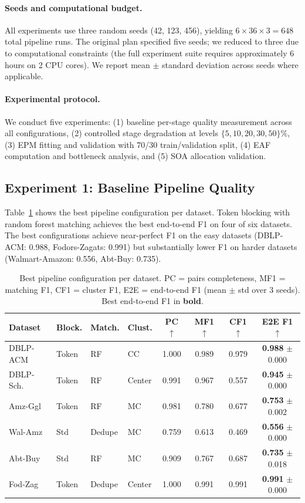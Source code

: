 \documentclass{article}
\begin{document}
\paragraph{Seeds and computational budget.}
All experiments use three random seeds (42, 123, 456), yielding $6 \times 36 \times 3 = 648$ total pipeline runs.
The original plan specified five seeds; we reduced to three due to computational constraints (the full experiment suite requires approximately 6 hours on 2 CPU cores). We report mean $\pm$ standard deviation across seeds where applicable.

\paragraph{Experimental protocol.}
We conduct five experiments: (1) baseline per-stage quality measurement across all configurations, (2) controlled stage degradation at levels $\{5, 10, 20, 30, 50\}\%$, (3) EPM fitting and validation with 70/30 train/validation split, (4) EAF computation and bottleneck analysis, and (5) SOA allocation validation.

\subsection{Experiment 1: Baseline Pipeline Quality}

Table~\ref{tab:best_configs} shows the best pipeline configuration per dataset. Token blocking with random forest matching achieves the best end-to-end F1 on four of six datasets. The best configurations achieve near-perfect F1 on the easy datasets (DBLP-ACM: 0.988, Fodors-Zagats: 0.991) but substantially lower F1 on harder datasets (Walmart-Amazon: 0.556, Abt-Buy: 0.735).

\begin{table}[t]
\caption{Best pipeline configuration per dataset. PC = pairs completeness, MF1 = matching F1, CF1 = cluster F1, E2E = end-to-end F1 (mean $\pm$ std over 3 seeds). Best end-to-end F1 in \textbf{bold}.}
\label{tab:best_configs}
\centering
\small
\begin{tabular}{llllcccc}
\toprule
Dataset & Block. & Match. & Clust. & PC $\uparrow$ & MF1 $\uparrow$ & CF1 $\uparrow$ & E2E F1 $\uparrow$ \\
\midrule
DBLP-ACM & Token & RF & CC & 1.000 & 0.989 & 0.979 & \textbf{0.988} {\scriptsize$\pm$0.000} \\
DBLP-Sch. & Token & RF & Center & 0.991 & 0.967 & 0.557 & \textbf{0.945} {\scriptsize$\pm$0.000} \\
Amz-Ggl & Token & RF & MC & 0.981 & 0.780 & 0.677 & \textbf{0.753} {\scriptsize$\pm$0.002} \\
Wal-Amz & Std & Dedupe & MC & 0.759 & 0.613 & 0.469 & \textbf{0.556} {\scriptsize$\pm$0.000} \\
Abt-Buy & Std & RF & MC & 0.909 & 0.767 & 0.687 & \textbf{0.735} {\scriptsize$\pm$0.018} \\
Fod-Zag & Token & Dedupe & Center & 1.000 & 0.991 & 0.991 & \textbf{0.991} {\scriptsize$\pm$0.000} \\
\bottomrule
\end{tabular}
\end{table}
\end{document}
